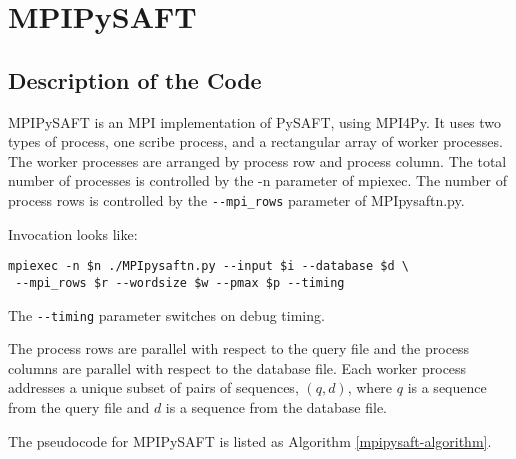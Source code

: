 \documentclass[11pt]{report}
\begin{document}
\chapter{MPIPySAFT}
\section{Description of the Code}

MPIPySAFT is an MPI implementation of PySAFT, using MPI4Py. It uses two types 
of process, one scribe process, and a rectangular array of worker processes.
The worker processes are arranged by process row and process column. 
The total number of processes is controlled by the -n parameter of mpiexec. 
The number of process rows is controlled by the \verb!--mpi_rows! parameter of MPIpysaftn.py.

Invocation looks like:
\begin{verbatim}
mpiexec -n $n ./MPIpysaftn.py --input $i --database $d \
 --mpi_rows $r --wordsize $w --pmax $p --timing
\end{verbatim}
The \verb!--timing! parameter switches on debug timing.

The process rows are parallel with respect to the query file and the process 
columns are parallel with respect to the database file. 
Each worker process addresses a unique subset of pairs of sequences, $(q,d)$, where $q$ is a sequence 
from the query file and $d$ is a sequence from the database file.

The pseudocode for MPIPySAFT is listed as Algorithm \ref{mpipysaft-algorithm}.
\end{document}
